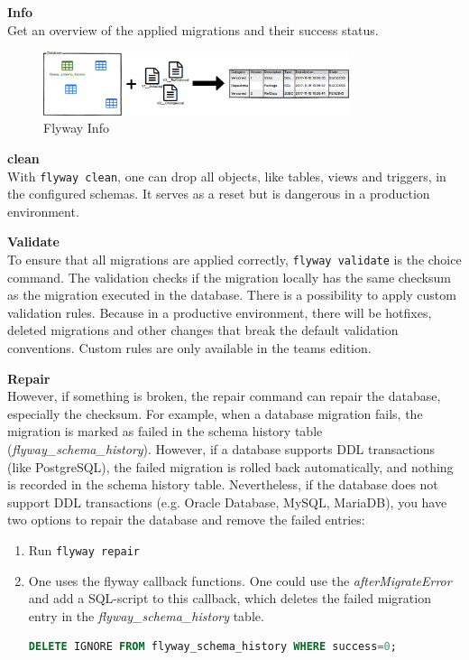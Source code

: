 \textbf{Info}\\
Get an overview of the applied migrations and their success status.\\

\begin{figure}[H]
	\centering
	\includegraphics[width=0.8\textwidth]{./chapters/intro_flyway/images/command-info}
	\caption[Flyway Info - Source: \cite{FlywayGetStarted}]{Flyway Info}
	\label{fig:command-info}
\end{figure}

\textbf{clean}\\
With \texttt{flyway clean}, one can drop all objects, like tables, views and triggers, in the configured schemas. It serves as a reset but is dangerous in a production environment.

\textbf{Validate}\\
To ensure that all migrations are applied correctly,  \texttt{flyway validate} is the choice command. The validation checks if the migration locally has the same checksum as the migration executed in the database.
There is a possibility to apply custom validation rules. Because in a productive environment, there will be hotfixes, deleted migrations and other changes that break the default validation conventions. Custom rules are only available in the teams edition.

\textbf{Repair}\\
However, if something is broken, the repair command can repair the database, especially the checksum. For example, when a database migration fails, the migration is marked as failed in the schema history table (\textit{flyway\_schema\_history}). However, if a database supports \gls{DDL} transactions (like PostgreSQL), the failed migration is rolled back automatically, and nothing is recorded in the schema history table. Nevertheless, if the database does not support DDL transactions (e.g. Oracle Database, MySQL, MariaDB), you have two options to repair the database and remove the failed entries:

\begin{enumerate}
	\item Run \texttt{flyway repair}\\
	\item One uses the flyway callback functions. One could use the \textit{afterMigrateError} and add a SQL-script to this callback, which deletes the failed migration entry in the \textit{flyway\_schema\_history} table.
	
	\begin{lstlisting}[language=SQL]
		DELETE IGNORE FROM flyway_schema_history WHERE success=0;
	\end{lstlisting}
\end{enumerate}


